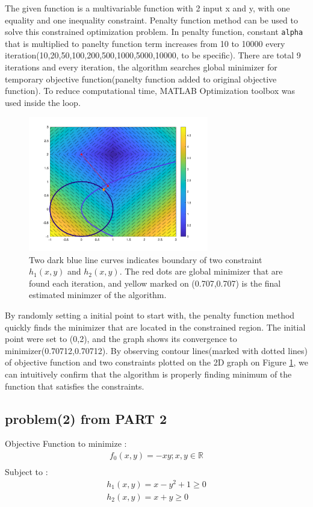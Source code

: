\documentclass[twoside,11pt]{article}
\begin{document}
The given function is a multivariable function with 2 input x and y, with one equality and one inequality constraint. Penalty function method can be used to solve this constrained optimization problem.
In penalty function, constant \texttt{alpha} that is multiplied to panelty function term increases from 10 to 10000 every iteration(10,20,50,100,200,500,1000,5000,10000, to be specific). There are total 9 iterations and every iteration, the algorithm searches global minimizer for temporary objective function(panelty function added to original objective function). To reduce computational time, MATLAB Optimization toolbox was used inside the loop.


\begin{figure}[!h]
    \centering
    \includegraphics[width=0.7\textwidth]{figs/cst_1.png}
    \caption{Two dark blue line curves indicates boundary of two constraint $h_1(x,y)$ and $h_2(x,y)$. The red dots are global minimizer that are found each iteration, and yellow marked on (0.707,0.707) is the final estimated minimzer of the algorithm.}
\label{constrained problem 1}
\end{figure}

By randomly setting a initial point to start with, the penalty function method quickly finds the minimizer that are located in the constrained region. The initial point were set to (0,2), and the graph shows its convergence to minimizer(0.70712,0.70712). By observing contour lines(marked with dotted lines) of objective function and two constraints plotted on the 2D graph on Figure \ref{constrained problem 1}, we can intuitively confirm that the algorithm is properly finding minimum of the function that satisfies the constraints.

\subsection*{problem(2) from PART 2}
Objective Function to minimize :
\begin{equation}
    \begin{array}{l}
    f_0(x,y)=-xy  ; x,y \in \mathbb{R} \\
    \end{array}
\end{equation}
Subject to :
\begin{equation}
    \begin{array}{l}
    h_1(x,y)=x-y^2+1 \ge 0 \\
    h_2(x,y)=x+y \ge 0
    \end{array}
\label{cst2-h}
\end{equation}
\end{document}
